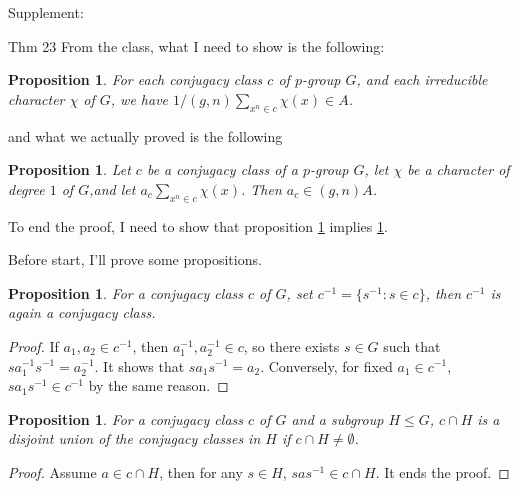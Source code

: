 \documentclass[a4paper, 12pt]{article}
\theoremstyle{Mydefinition}
\theoremstyle{Mytheorem}
\newtheorem{proposition}[statement]{Proposition}
\begin{document}
Supplement:

\noindent Thm 23
From the class, what I need to show is the following:
\begin{proposition}\label{HW10:Prop:3}
For each conjugacy class $c$ of $p$-group $G$, and each irreducible character $\chi$ of $G$, we have $1/(g,n)\sum_{x^n\in c}\chi(x)\in A$.
\end{proposition}
and what we actually proved is the following
\begin{proposition}\label{HW10:Prop:4}
Let $c$ be a conjugacy class of a $p$-group $G$, let $\chi$ be a character of degree $1$ of $G$,and let $a_c\sum_{x^n\in c}\chi(x)$. Then $a_c\in (g,n)A$.
\end{proposition}
To end the proof, I need to show that proposition \ref{HW10:Prop:4} implies \ref{HW10:Prop:3}.

Before start, I'll prove some propositions.
\begin{proposition}
For a conjugacy class $c$ of $G$, set $c^{-1} = \{s^{-1}:s\in c\}$, then $c^{-1}$ is again a conjugacy class.
\end{proposition}
\begin{proof}
If $a_1,a_2\in c^{-1}$, then $a_1^{-1},a_2^{-1}\in c$, so there exists $s\in G$ such that $sa_1^{-1}s^{-1} =a_2^{-1}$. It shows that $sa_1s^{-1}=a_2$. Conversely, for fixed $a_1\in c^{-1}$, $sa_1s^{-1}\in c^{-1}$ by the same reason.
\end{proof}
\begin{proposition}\label{HW10:Prop:5}
For a conjugacy class $c$ of $G$ and a subgroup $H\leq G$, $c\cap H$ is a disjoint union of the conjugacy classes in $H$ if $c\cap H\neq \emptyset$.
\end{proposition}
\begin{proof}
Assume $a\in c\cap H$, then for any $s\in H$, $sas^{-1}\in c\cap H$. It ends the proof.
\end{proof}
\end{document}
